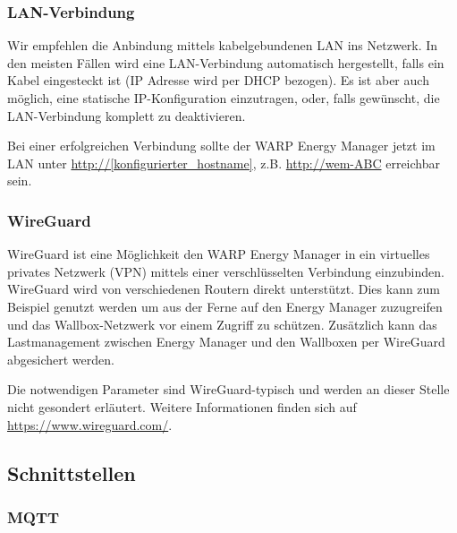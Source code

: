 \documentclass[a4paper,10pt]{article}
\newcommand{\gfx}[1]{\texttt{[image: \#1]}}
\begin{document}
\begin{multicols*}{2}
	\subsubsection{LAN-Verbindung}
	Wir empfehlen die Anbindung mittels kabelgebundenen LAN ins Netzwerk.
	In den meisten Fällen wird eine
	LAN-Verbindung automatisch hergestellt, falls ein Kabel eingesteckt ist
	(IP Adresse wird per DHCP bezogen). Es ist aber auch möglich,
	eine statische IP-Konfiguration	einzutragen, oder, falls gewünscht, die LAN-Verbindung
	komplett zu deaktivieren.

	Bei einer erfolgreichen Verbindung sollte der WARP Energy Manager jetzt im LAN unter
	\url{http://[konfigurierter_hostname]}, z.B. \url{http://wem-ABC} erreichbar sein.


	\subsubsection{WireGuard}

	WireGuard ist eine Möglichkeit den WARP Energy Manager in ein virtuelles privates Netzwerk (VPN)
	mittels einer verschlüsselten Verbindung einzubinden. WireGuard wird von
	verschiedenen Routern direkt unterstützt. Dies kann zum Beispiel genutzt
	werden um aus der Ferne auf den Energy Manager zuzugreifen und das
	Wallbox-Netzwerk vor einem Zugriff zu schützen. Zusätzlich kann das
	Lastmanagement zwischen Energy Manager und den Wallboxen per WireGuard abgesichert werden.

	Die notwendigen Parameter sind WireGuard-typisch und werden an dieser Stelle
	nicht gesondert erläutert. Weitere Informationen finden sich auf
	\url{https://www.wireguard.com/}.


	\subsection{Schnittstellen}
	\subsubsection{MQTT}
	\label{mqtt-interface}


\end{multicols*}
\end{document}
